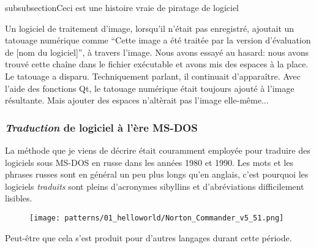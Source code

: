 subsubsection{Ceci est une histoire vraie de piratage de logiciel}
\label{\SoftwareCracking}

Un logiciel de traitement d'image, lorsqu'il n'était pas enregistré, ajoutait un
tatouage numérique comme ``Cette image a été traitée par la version d'évaluation
de [nom du logiciel]'', à travers l'image.
Nous avons essayé au hasard: nous avons trouvé cette chaîne dans le fichier exécutable
et avons mis des espaces à la place.
Le tatouage a disparu.
Techniquement parlant, il continuait d'apparaître.
Avec l'aide des fonctions Qt, le tatouage numérique était toujours ajouté à l'image
résultante.
Mais ajouter des espaces n'altèrait pas l'image elle-même...

\subsubsection{\emph{Traduction} de logiciel à l'ère MS-DOS}

La méthode que je viens de décrire était couramment employée pour traduire des logiciels sous MS-DOS en russe dans les
années 1980 et 1990.
Les mots et les phrases russes sont en général un peu plus longs qu'en anglais, c'est pourquoi les logiciels
\emph{traduits} sont pleins d'acronymes sibyllins et d'abréviations difficilement lisibles.

\begin{figure}[H]
\centering
\texttt{[image: patterns/01\_helloworld/Norton\_Commander\_v5\_51.png]}
\caption{\FRph{}}
\end{figure}

Peut-être que cela s'est produit pour d'autres langages durant cette période.

